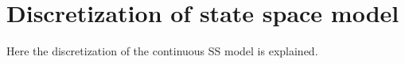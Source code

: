 \chapter{Discretization of state space model}
\label{cha:discret_SS}

Here the discretization of the continuous SS model is explained.